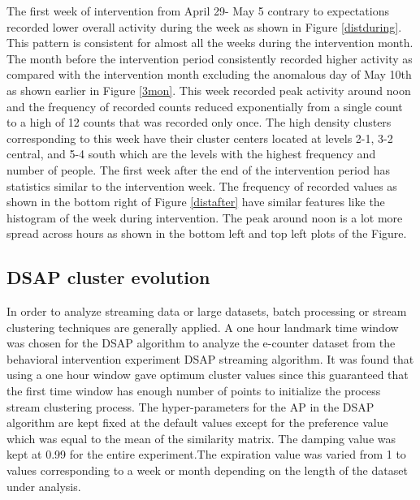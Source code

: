 The first week of intervention from April 29- May 5 contrary to expectations recorded lower overall activity during the week as shown in Figure \ref{distduring}. This pattern is consistent for almost all the weeks during the intervention month. The month before the intervention period consistently recorded higher activity as compared with the intervention month excluding the anomalous day of May 10th as shown earlier in Figure \ref{3mon}. This week recorded peak activity around noon and the frequency of recorded counts reduced exponentially from a single count to a high of 12 counts that was recorded only once. The high density clusters corresponding to this week have their cluster centers located at levels 2-1, 3-2 central, and 5-4 south which are the levels with the highest frequency and number of people. The first week after the end of the intervention period has statistics similar to the intervention week. The frequency of recorded values as shown in the bottom right of Figure \ref{distafter} have similar features like the histogram of the week during intervention. The peak around noon is a lot more spread across hours as shown in the bottom left and top left plots of the Figure.


\subsection{DSAP cluster evolution}

In order to analyze streaming data or large datasets, batch processing or stream clustering techniques are generally applied. A one hour landmark time window was chosen for the DSAP algorithm to analyze the e-counter dataset from the behavioral intervention experiment DSAP streaming algorithm. It was found that using a one hour window gave optimum cluster values since this guaranteed that the first time window has enough number of points to initialize the process stream clustering process. The hyper-parameters for the AP in the DSAP algorithm are kept fixed at the default values except for the preference value which was equal to the mean of the similarity matrix. The damping value was kept at 0.99 for the entire experiment.The expiration value was varied from 1 to values corresponding to a week or month depending on the length of the dataset under analysis.%
 
